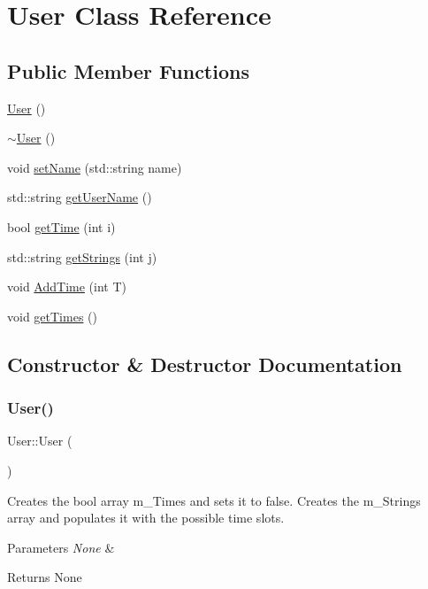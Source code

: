 \hypertarget{class_user}{}\section{User Class Reference}
\label{class_user}
\subsection*{Public Member Functions}
\begin{DoxyCompactItemize}
\item 
\mbox{\hyperlink{class_user_a4a0137053e591fbb79d9057dd7d2283d}{User}} ()
\item 
\mbox{\hyperlink{class_user_ac00b72ad64eb4149f7b21b9f5468c2b2}{$\sim$\+User}} ()
\item 
void \mbox{\hyperlink{class_user_a93c208c3a71df99ca19a1782f6d32c34}{set\+Name}} (std\+::string name)
\item 
std\+::string \mbox{\hyperlink{class_user_a3fcf5814ba0a2415862c892746585a46}{get\+User\+Name}} ()
\item 
bool \mbox{\hyperlink{class_user_ab4ba945b0431a19fef9710b16aac4bb5}{get\+Time}} (int i)
\item 
std\+::string \mbox{\hyperlink{class_user_a3b0b9cf712efbb632f920a4cc5f18925}{get\+Strings}} (int j)
\item 
void \mbox{\hyperlink{class_user_a3a637aa0a7a7b37885f2cd7dc77ecd99}{Add\+Time}} (int T)
\item 
void \mbox{\hyperlink{class_user_a70486059b5ee29b656c8331583cdd5b5}{get\+Times}} ()
\end{DoxyCompactItemize}


\subsection{Constructor \& Destructor Documentation}
\mbox{\label{class_user_a4a0137053e591fbb79d9057dd7d2283d}} 
\subsubsection{\texorpdfstring{User()}{User()}}
{\footnotesize\ttfamily User\+::\+User (\begin{DoxyParamCaption}{ }\end{DoxyParamCaption})}

Creates the bool array m\+\_\+\+Times and sets it to false. Creates the m\+\_\+\+Strings array and populates it with the possible time slots. 
\begin{DoxyParams}{Parameters}
{\em None} & \\
\hline
\end{DoxyParams}
\begin{DoxyReturn}{Returns}
None 
\end{DoxyReturn}
\mbox{\label{class_user_ac00b72ad64eb4149f7b21b9f5468c2b2}} 
